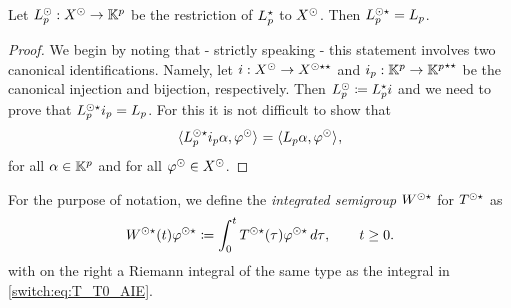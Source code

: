 \begin{lemma}\label{switch:lem:Lp}
  Let $L_p^{\odot} : X^{\odot} \to \mathbb{K}^p$ be the restriction of $L_p^{\star}$ to $X^{\odot}$. Then $L_p^{\odot\star} = L_p$.
\end{lemma}
\begin{proof}
  We begin by noting that - strictly speaking - this statement involves two canonical identifications. Namely, let $i : X^{\odot} \to X^{\odot\star\star}$ and $i_p : \mathbb{K}^p \to {\mathbb{K}^p}^{\star\star}$ be the canonical injection and bijection, respectively. Then $L_p^{\odot} \coloneqq L_p^{\star} i$ and we need to prove that $L_p^{\odot\star}i_p = L_p$. For this it is not difficult to show that
  \[
    \langle L_p^{\odot\star}i_p\alpha,\varphi^{\odot} \rangle_{} = \langle L_p\alpha,\varphi^{\odot} \rangle_{},
  \]
  for all $\alpha \in \mathbb{K}^p$ and for all $\varphi^{\odot} \in X^{\odot}$.
\end{proof}

For the purpose of notation, we define the \emph{integrated semigroup} $W^{\odot\star}$ for  $T^{\odot\star}$ as
\begin{equation}\label{switch:eq:integrated_semigroup}
  W^{\odot\star}(t)\varphi^{\odot\star} \coloneqq \int_0^t{T^{\odot\star}(\tau)\varphi^{\odot\star}\,d\tau}, \qquad t \ge 0.
\end{equation}
with on the right a {\WSTAR} Riemann integral of the same type as the integral in \cref{switch:eq:T_T0_AIE}.

